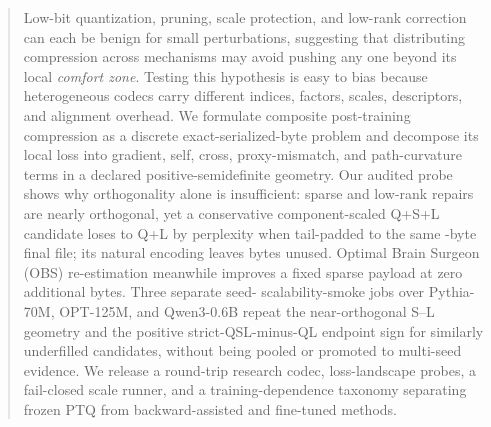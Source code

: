 \documentclass{article}
\theoremstyle{plain}
\theoremstyle{remark}
\begin{document}

\printAffiliationsAndNotice{}

\begin{abstract}
Low-bit quantization, pruning, scale protection, and low-rank correction can each be benign for small perturbations, suggesting that distributing compression across mechanisms may avoid pushing any one beyond its local \emph{comfort zone}.  Testing this hypothesis is easy to bias because heterogeneous codecs carry different indices, factors, scales, descriptors, and alignment overhead.  We formulate composite post-training compression as a discrete exact-serialized-byte problem and decompose its local loss into gradient, self, cross, proxy-mismatch, and path-curvature terms in a declared positive-semidefinite geometry.  Our audited \VerifiedModel{} probe shows why orthogonality alone is insufficient: sparse and low-rank repairs are nearly orthogonal, yet a conservative component-scaled Q+S+L candidate loses to Q+L by \StrictQSLMinusQLPPL{} perplexity when tail-padded to the same \QLBytes{}-byte final file; its natural encoding leaves \StrictQSLTailPaddingBytes{} bytes unused.  Optimal Brain Surgeon (OBS) re-estimation meanwhile improves a fixed sparse payload at zero additional bytes.  Three separate seed-\ScalePilotSeed{} scalability-smoke jobs over Pythia-70M, OPT-125M, and Qwen3-0.6B repeat the near-orthogonal S--L geometry and the positive strict-QSL-minus-QL endpoint sign for similarly underfilled candidates, without being pooled or promoted to multi-seed evidence.  We release a round-trip research codec, loss-landscape probes, a fail-closed scale runner, and a training-dependence taxonomy separating frozen PTQ from backward-assisted and fine-tuned methods.
\end{abstract}







\FloatBarrier

\end{document}
